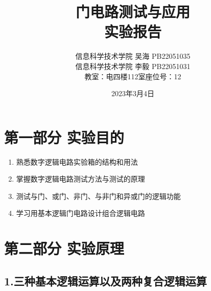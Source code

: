 \documentclass{ctexart}
\title{\Large 门电路测试与应用\\{\large 实验报告}}
\author{\large  信息科学技术学院 \quad 吴海\MyFont{垚} PB22051035 \\\large  信息科学技术学院 \quad 李\quad 毅 PB22051031 \\{教室：电四楼112室\quad 座位号：12}}
\date{2023年3月4日}
\begin{document}
    \maketitle
    \thispagestyle{empty}
    
    \newpage 
    \setcounter{page}{1}

    \section*{第一部分 \quad 实验目的}
    \begin{enumerate}
        \item 熟悉数字逻辑电路实验箱的结构和用法
        \item 掌握数字逻辑电路测试方法与测试的原理
        \item 测试与门、或门、非门、与非门和异或门的逻辑功能
        \item 学习用基本逻辑门电路设计组合逻辑电路
    \end{enumerate}
    \section*{第二部分 \quad 实验原理}
    \subsection*{1.三种基本逻辑运算以及两种复合逻辑运算}
\end{document}
